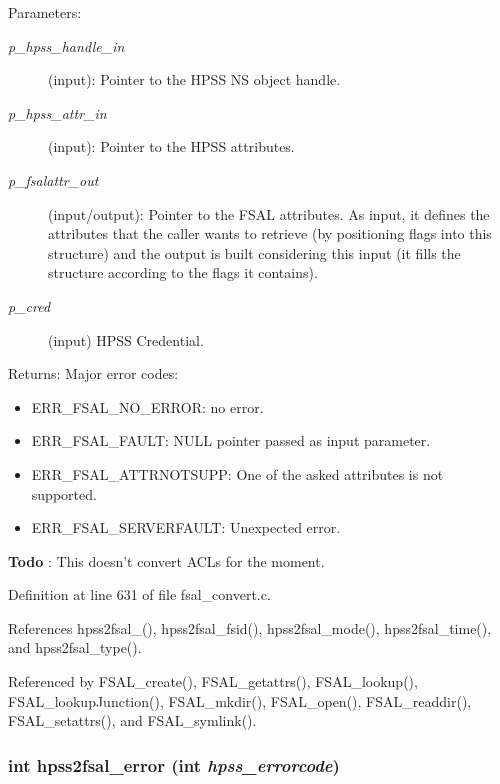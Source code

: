 \begin{Desc}
\item[Parameters:]
\begin{description}
\item[{\em p\_\-hpss\_\-handle\_\-in}](input): Pointer to the HPSS NS object handle. \item[{\em p\_\-hpss\_\-attr\_\-in}](input): Pointer to the HPSS attributes. \item[{\em p\_\-fsalattr\_\-out}](input/output): Pointer to the FSAL attributes. As input, it defines the attributes that the caller wants to retrieve (by positioning flags into this structure) and the output is built considering this input (it fills the structure according to the flags it contains). \item[{\em p\_\-cred}](input) HPSS Credential.\end{description}
\end{Desc}
\begin{Desc}
\item[Returns:]Major error codes:\begin{itemize}
\item ERR\_\-FSAL\_\-NO\_\-ERROR: no error.\item ERR\_\-FSAL\_\-FAULT: NULL pointer passed as input parameter.\item ERR\_\-FSAL\_\-ATTRNOTSUPP: One of the asked attributes is not supported.\item ERR\_\-FSAL\_\-SERVERFAULT: Unexpected error.\end{itemize}
\end{Desc}


\begin{Desc}
\item[{\bf Todo}]: This doesn't convert ACLs for the moment.\end{Desc}


Definition at line 631 of file fsal\_\-convert.c.

References hpss2fsal\_(), hpss2fsal\_\-fsid(), hpss2fsal\_\-mode(), hpss2fsal\_\-time(), and hpss2fsal\_\-type().

Referenced by FSAL\_\-create(), FSAL\_\-getattrs(), FSAL\_\-lookup(), FSAL\_\-lookup\-Junction(), FSAL\_\-mkdir(), FSAL\_\-open(), FSAL\_\-readdir(), FSAL\_\-setattrs(), and FSAL\_\-symlink().
\subsubsection{\setlength{\rightskip}{0pt plus 5cm}int hpss2fsal\_\-error (int {\em hpss\_\-errorcode})}\label{fsal__convert_8c_a2}


